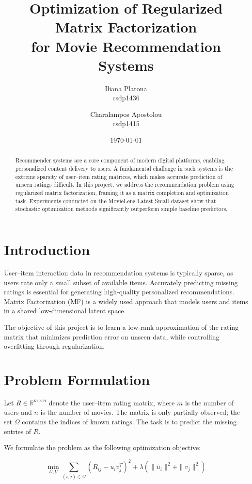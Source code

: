 \documentclass[11pt]{article}
\title{Optimization of Regularized Matrix Factorization\\
for Movie Recommendation Systems}
\author{Iliana Platona\\csdp1436 \and Charalampos Apostolou\\csdp1415}
\date{\normalsize\today}
\begin{document}
\maketitle

\begin{abstract}
Recommender systems are a core component of modern digital platforms, enabling personalized content delivery to users. A fundamental challenge in such systems is the extreme sparsity of user--item rating matrices, which makes accurate prediction of unseen ratings difficult. In this project, we address the recommendation problem using regularized matrix factorization, framing it as a matrix completion and optimization task. Experiments conducted on the MovieLens Latest Small dataset show that stochastic optimization methods significantly outperform simple baseline predictors.
\end{abstract}

\section{Introduction}
User--item interaction data in recommendation systems is typically sparse, as users rate only a small subset of available items. Accurately predicting missing ratings is essential for generating high-quality personalized recommendations. Matrix Factorization (MF) is a widely used approach that models users and items in a shared low-dimensional latent space.

The objective of this project is to learn a low-rank approximation of the rating matrix that minimizes prediction error on unseen data, while controlling overfitting through regularization.

\section{Problem Formulation}
Let $R \in \mathbb{R}^{m \times n}$ denote the user--item rating matrix, where $m$ is the number of users and $n$ is the number of movies. The matrix is only partially observed; the set $\Omega$ contains the indices of known ratings. The task is to predict the missing entries of $R$.

We formulate the problem as the following optimization objective:

\begin{equation}
\min_{U,V} \sum_{(i,j) \in \Omega} (R_{ij} - u_i v_j^T)^2 + \lambda (\|u_i\|^2 + \|v_j\|^2)
\end{equation}
\end{document}
